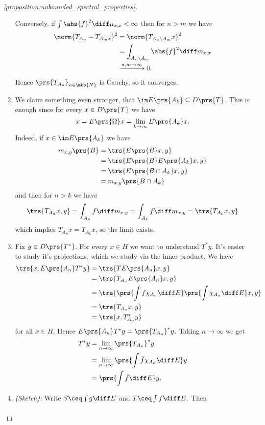 \documentclass[10pt, twoside]{book}
\begin{document}
\begin{proof}[\ref{proposition:unbounded_spectral_properties}]
\begin{enumerate}
Conversely, if $\int \abs{f}^2 \diff \mu_{x,x} < \infty$ then for $n>m$ we have
\begin{align*}
\norm{T_{A_n} - T_{A_m x}}^2 &= \norm{T_{A_n \setminus A_m} x}^2
\\&= \int_{A_n \setminus A_m} \abs{f}^2 \diff m_{x,x}
\\&\xrightarrow{n,m \to \infty} 0 \text{.}
\end{align*}
Hence $\prs{T_{A_n}}_{n \in \mbb{N}}$ is Cauchy, so it converges.
\item%
We claim something even stronger, that $\im E\prs{A_k} \subseteq D\prs{T}$. This is enough since for every $x \in D\prs{T}$ we have
\[x = E\prs{\Omega}x = \lim_{k\to\infty} E\prs{A_k} x \text{.}\]
Indeed, if $x \in \im E\prs{A_k}$ we have
\begin{align*}
m_{x,y}\prs{B} &= \trs{E\prs{B} x, y}
\\&= \trs{E\prs{B} E\prs{A_k} x, y}
\\&= \trs{E\prs{B \cap A_k} x, y}
\\&= m_{x,y}\prs{B \cap A_k}
\end{align*}
and then for $n>k$ we have
\[\trs{T_{A_n}x, y} = \int_{A_n} f \diff m_{x,y} = \int_{A_k} f\diff m_{x,y} = \trs{T_{A_k} x, y}\]
which implies $T_{A_n}x = T_{A_k}x$, so the limit exists.
\item%
Fix $y \in D\prs{T^*}$. For every $x \in H$ we want to understand $T^* y$. It's easier to study it's projections, which we study via the inner product. We have
\begin{align*}
\trs{x, E\prs{A_n} T^* y} &= \trs{T E\prs{A_n}x, y}
\\&= \trs{T_{A_n} E\prs{A_n}x,y}
\\&= \trs{\prs{\int f \chi_{A_n} \diff E}\prs{\int \chi_{A_n} \diff E}x,y}
\\&= \trs{T_{A_n} x, y}
\\&= \trs{x, T_{A_n}^*y}
\end{align*}
for all $x \in H$. Hence $E\prs{A_n}T^*y = \prs{T_{A_n}}^*y$.
Taking $n \to \infty$ we get
\begin{align*}
T^* y &= \lim_{n\to\infty} \prs{T_{A_n}}^* y \\&= \lim_{n\to\infty} \prs{\int \bar{f} \chi_{A_n} \diff E} y \\&= \prs{\int \bar{f} \diff E} y \text{.}
\end{align*}
\item%
\emph{(Sketch):} Write $S \ceq \int g \diff E$ and $T \ceq \int f \diff E$. Then
\begin{align*}

\end{align*}
\end{enumerate}
\end{proof}
\end{document}
